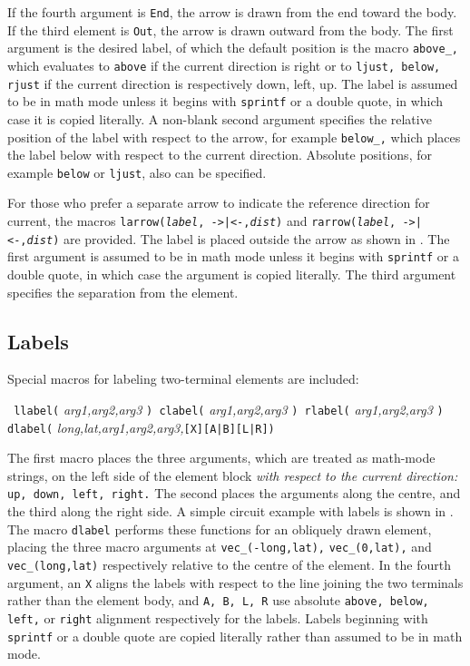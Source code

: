 If the fourth argument is {\tt End}, the arrow is drawn from the end
toward the body.
If the third element is {\tt Out}, the arrow is drawn outward from the body.
The first argument is the desired label, of which the default position is
the macro {\tt above\_,} which evaluates to {\tt above} if the current
direction is right or to {\tt ljust, below, rjust} if the current
direction is respectively down, left, up.  The label is assumed to be
in math mode unless it begins with {\tt sprintf} or a double quote, in which
case it is copied literally.  A non-blank second argument specifies the
relative position of the label with respect to the arrow, for example
{\tt below\_,} which places the label below with respect to the current
direction.  Absolute positions, for example {\tt below} or {\tt ljust},
also can be specified.

For those who prefer a separate arrow to indicate the reference
direction for current, the macros {\tt larrow({\sl label}, ->|<-,{\sl dist})}
and {\tt rarrow({\sl label}, ->|<-,{\sl dist})} are provided.  The label is
placed outside the arrow as shown in .  The first
argument is assumed to be in math mode unless
it begins with {\tt sprintf} or a double
quote, in which case the argument is copied literally.  The third argument
specifies the separation from the element.

\subsection{Labels\label{Labels:}}
   Special macros for labeling two-terminal elements are included:
\par
{\tt
   llabel(} {\sl arg1,arg2,arg3} {\tt )
      \hfill\break\hspace*{\parindent}%
   clabel(} {\sl arg1,arg2,arg3} {\tt )
      \hfill\break\hspace*{\parindent}%
   rlabel(} {\sl arg1,arg2,arg3} {\tt )
      \hfill\break\hspace*{\parindent}%
   dlabel(} {\sl long,lat,arg1,arg2,arg3,}{\tt[X][A|B][L|R])}

The first macro places the three arguments, which are treated as math-mode
strings, on the left side of the element block {\em with respect to the
current direction:} {\tt up, down, left, right.}
The second places the arguments along the centre, and the third along the
right side.
A simple circuit example with labels is shown in .
The macro {\tt dlabel} performs these functions for an
obliquely drawn element, placing the three macro arguments at
{\tt vec\_(-long,lat),} {\tt vec\_(0,lat),} and {\tt vec\_(long,lat)}
respectively relative to the centre of the element.
In the fourth argument, an {\tt X} aligns the labels with respect to the line
joining the two terminals rather than the element body, and
{\tt A, B, L, R} use absolute {\tt above, below, left,} or {\tt right} alignment
respectively for the labels.
Labels beginning
with {\tt sprintf} or a double quote are copied literally rather than
assumed to be in math mode.


